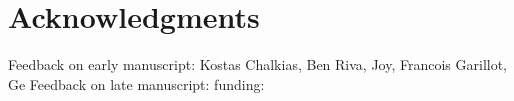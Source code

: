 \section*{Acknowledgments}
Feedback on early manuscript: Kostas Chalkias, Ben Riva, Joy, Francois Garillot, Ge
Feedback on late manuscript:
funding: